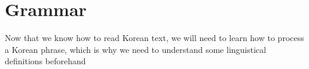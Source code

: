 \section{Grammar}

Now that we know how to read Korean text, we will need to learn how to process a Korean phrase, which is why we need to understand some linguistical definitions beforehand

